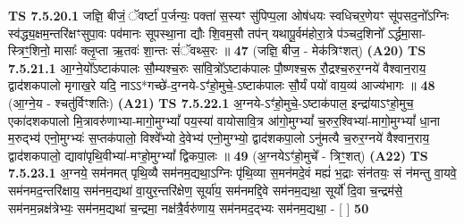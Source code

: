 \documentclass[17pt]{extarticle}
\begin{document}
                                        \textbf{ TS 7.5.20.1} \newline
                  जज्ञि॒ बीजं॒ ॅवर्ष्टा॑ प॒र्जन्यः॒ पक्ता॑ स॒स्यꣳ सु॑पिप्प॒ला ओष॑धयः स्वधिचर॒णेयꣳ सू॑पसद॒नो᳚ऽग्निः स्व॑द्ध्य॒क्षम॒न्तरि॑क्षꣳसुपा॒वः पव॑मानः सूपस्था॒ना द्यौः शि॒वम॒सौ तप॑न् यथापू॒र्वम॑होरा॒त्रे प॑ञ्चद॒शिनो᳚ ऽर्द्धमा॒सा-स्त्रिꣳ॒॒शिनो॒ मासाः᳚ क्लृ॒प्ता ऋ॒तवः॑ शा॒न्तः सं॑ॅवथ्स॒रः ॥ \textbf{  47} \newline
                  \newline
                      (जज्ञि॒ बीज॒ - मेक॑त्रिꣳशत्)  \textbf{(A20)} \newline \newline
                                        \textbf{ TS 7.5.21.1} \newline
                  आ॒ग्ने॒यो᳚ऽष्टाक॑पालः सौ॒म्यश्च॒रुः सा॑वि॒त्रो᳚ऽष्टाक॑पालः पौ॒ष्णश्च॒रू रौ॒द्रश्च॒रुर॒ग्नये॑ वैश्वान॒राय॒ द्वाद॑शकपालो मृगाख॒रे यदि॒ नाऽऽ*गच्छे॑-द॒ग्नये-ऽꣳ॑हो॒मुचे॒-ऽष्टाक॑पालः सौ॒र्यं पयो॑ वाय॒व्य॑ आज्य॑भागः ॥ \textbf{  48} \newline
                  \newline
                      (आ॒ग्ने॒य - श्चतु॑र्विꣳशतिः)  \textbf{(A21)} \newline \newline
                                        \textbf{ TS 7.5.22.1} \newline
                  अ॒ग्नये-ऽꣳ॑हो॒मुचे॒-ऽष्टाक॑पाल॒ इन्द्रा॑याऽꣳहो॒मुच॒ एका॑दशकपालो मि॒त्रावरु॑णाभ्या-मागो॒मुग्भ्यां᳚ पय॒स्या॑ वायोसावि॒त्र आ॑गो॒मुग्भ्यां᳚ च॒रुर॒श्विभ्या॑-मागो॒मुग्भ्यां᳚ धा॒ना म॒रुद्भ्य॑ एनो॒मुग्भ्यः॑ स॒प्तक॑पालो॒ विश्वे᳚भ्यो दे॒वेभ्य॑ एनो॒मुग्भ्यो॒ द्वाद॑शकपा॒लो ऽनु॑मत्यै च॒रुर॒ग्नये॑ वैश्वान॒राय॒ द्वाद॑शकपालो॒ द्यावा॑पृथि॒वीभ्या॑-मꣳहो॒मुग्भ्यां᳚ द्विकपा॒लः ॥ \textbf{  49} \newline
                  \newline
                      (अ॒ग्नयेऽꣳ॑हो॒मुचे᳚ - त्रिꣳ॒॒शत्)  \textbf{(A22)} \newline \newline
                                        \textbf{ TS 7.5.23.1} \newline
                  अ॒ग्नये॒ सम॑नमत् पृथि॒व्यै सम॑नम॒द्यथा॒ऽग्निः पृ॑थि॒व्या स॒मन॑मदे॒वं मह्यं॑ भ॒द्राः संन॑तयः॒ सं न॑मन्तु वा॒यवे॒ सम॑नमद॒न्तरि॑क्षाय॒ सम॑नम॒द्यथा॑ वा॒युर॒न्तरि॑क्षेण॒ सूर्या॑य॒ सम॑नमद्दि॒वे सम॑नम॒द्यथा॒ सूर्यो॑ दि॒वा च॒न्द्रम॑से॒ सम॑नम॒न्नक्ष॑त्रेभ्यः॒ सम॑नम॒द्यथा॑ च॒न्द्रमा॒ नक्ष॑त्रै॒र्वरु॑णाय॒ सम॑नमद॒द्भ्यः सम॑नम॒द्यथा॒ - [  ] \textbf{  50} \newline
\end{document}
